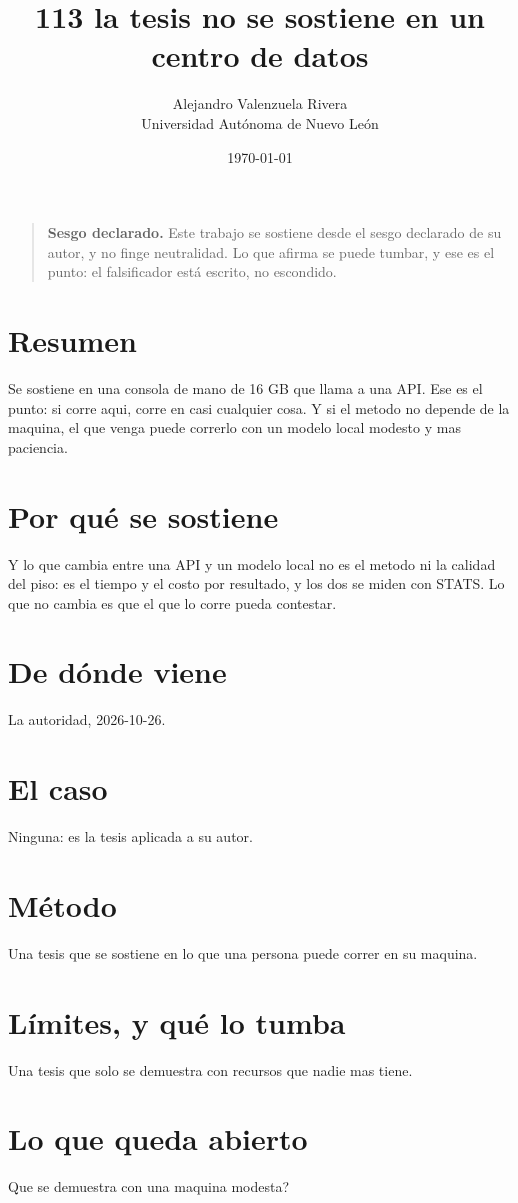 \documentclass[11pt,a4paper]{article}
\title{113 la tesis no se sostiene en un centro de datos}
\author{Alejandro Valenzuela Rivera\\\small Universidad Autónoma de Nuevo León}
\date{\today}
\begin{document}
\maketitle

\begin{quote}
\textbf{Sesgo declarado.} Este trabajo se sostiene desde el sesgo declarado de su autor, y no finge neutralidad. Lo que afirma se puede tumbar, y ese es el punto: el falsificador está escrito, no escondido.
\end{quote}

\section*{Resumen}
Se sostiene en una consola de mano de 16 GB que llama a una API. Ese es el punto: si corre aqui, corre en casi cualquier cosa. Y si el metodo no depende de la maquina, el que venga puede correrlo con un modelo local modesto y mas paciencia.

\section{Por qué se sostiene}
Y lo que cambia entre una API y un modelo local no es el metodo ni la calidad del piso: es el tiempo y el costo por resultado, y los dos se miden con STATS. Lo que no cambia es que el que lo corre pueda contestar.

\section{De dónde viene}
La autoridad, 2026-10-26.

\section{El caso}
Ninguna: es la tesis aplicada a su autor.

\section{Método}
Una tesis que se sostiene en lo que una persona puede correr en su maquina.

\section{Límites, y qué lo tumba}
Una tesis que solo se demuestra con recursos que nadie mas tiene.

\section{Lo que queda abierto}
\textquestiondown{}Que se demuestra con una maquina modesta?
\end{document}
